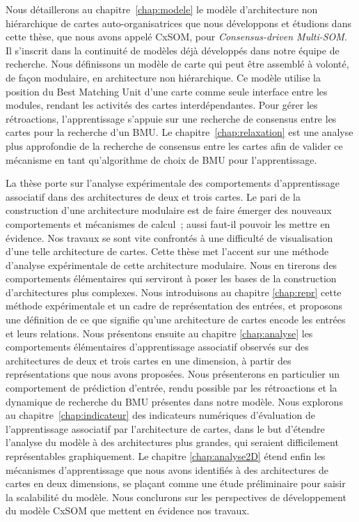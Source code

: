Nous détaillerons au chapitre~\ref{chap:modele} le modèle d'architecture non hiérarchique de cartes auto-organisatrices que nous développons et étudions dans cette thèse, que nous avons appelé CxSOM, pour \emph{Consensus-driven Multi-SOM}. Il s'inscrit dans la continuité de modèles déjà développés dans notre équipe de recherche.
Nous définissons un modèle de carte qui peut être assemblé à volonté, de façon modulaire, en architecture non hiérarchique. Ce modèle utilise la position du Best Matching Unit d'une carte comme seule interface entre les modules, rendant les activités des cartes interdépendantes. Pour gérer les rétroactions, l'apprentissage s'appuie sur une recherche de consensus entre les cartes pour la recherche d'un BMU.
Le chapitre~\ref{chap:relaxation} est une analyse plus approfondie de la recherche de consensus entre les cartes afin de valider ce mécanisme en tant qu'algorithme de choix de BMU pour l'apprentissage.

La thèse porte sur l'analyse expérimentale des comportements d'apprentissage associatif dans des architectures de deux et trois cartes. Le pari de la construction d'une architecture modulaire est de faire émerger des nouveaux comportements et mécanismes de calcul~; aussi faut-il pouvoir les mettre en évidence. Nos travaux se sont vite confrontés à une difficulté de visualisation d'une telle architecture de cartes. Cette thèse met l'accent sur une méthode d'analyse expérimentale de cette architecture modulaire. Nous en tirerons des comportements élémentaires qui serviront à poser les bases de la construction d'architectures plus complexes.
Nous introduisons au chapitre \ref{chap:repr} cette méthode expérimentale et un cadre de représentation des entrées, et proposons une définition de ce que signifie qu'une architecture de cartes encode les entrées et leurs relations.
Nous présentons ensuite au chapitre \ref{chap:analyse} les comportements élémentaires d'apprentissage associatif observés sur des architectures de deux et trois cartes en une dimension, à partir des représentations que nous avons proposées. Nous présenterons en particulier un comportement de prédiction d'entrée, rendu possible par les rétroactions et la dynamique de recherche du BMU présentes dans notre modèle.
Nous explorons au chapitre~\ref{chap:indicateur} des indicateurs numériques d'évaluation de l'apprentissage associatif par l'architecture de cartes, dans le but d'étendre l'analyse du modèle à des architectures plus grandes, qui seraient difficilement représentables graphiquement.
Le chapitre \ref{chap:analyse2D} étend enfin les mécanismes d'apprentissage que nous avons identifiés à des architectures de cartes en deux dimensions, se plaçant comme une étude préliminaire pour saisir la scalabilité du modèle.
Nous conclurons sur les perspectives de développement du modèle CxSOM que mettent en évidence nos travaux.

